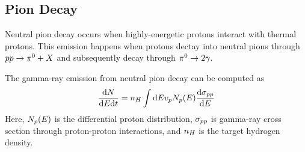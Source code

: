 \subsection{Pion Decay}

Neutral pion decay occurs when highly-energetic protons interact with
thermal protons. This
emission happens when protons dectay into neutral pions through $pp \rightarrow
\pi^0 + X$ and subsequently decay through $\pi^0 \rightarrow 2\gamma$.

The gamma-ray emission from neutral pion decay can be computed
as
\begin{equation}
  \frac{\text{d}N}{\text{d}E\text{d}t} = 
  n_H \int \text{d}E v_p N_p(E) 
  \frac{\text{d}\sigma_{pp}}{\text{d}E}
\end{equation}
Here, $N_p(E)$ is the differential proton
distribution,
$\sigma_{pp}$ is gamma-ray cross section through proton-proton interactions,
and $n_H$ is the target hydrogen density.


